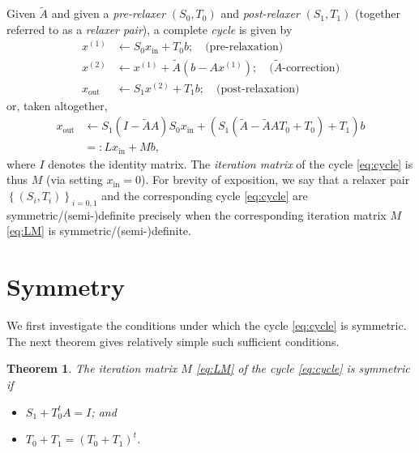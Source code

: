 \documentclass{article}
\newtheorem{theorem}{Theorem}
\begin{document}
Given $\widetilde{A}$ and given a \emph{pre-relaxer} $\left( S_0, T_0 \right)$ and \emph{post-relaxer} $\left( S_1, T_1 \right)$ (together referred to as a \emph{relaxer pair}), a complete \emph{cycle} is given by
\begin{equation} \label{eq:cycle}
\begin{split}
x^{(1)} & \leftarrow S_0 x_{\text{in}} + T_0 b; \quad \text{(pre-relaxation)} \\
x^{(2)} & \leftarrow x^{(1)} + \widetilde{A} \left( b - A x^{(1)} \right); \quad \text{($\widetilde{A}$-correction)} \\
x_{\text{out}} & \leftarrow S_1 x^{(2)} + T_1 b; \quad \text{(post-relaxation)}
\end{split}
\end{equation}
or, taken altogether,
\begin{subequations} \label{eq:LM}
\begin{align}
x_{\text{out}}
  & \leftarrow S_1 \left( I - \widetilde{A} A \right) S_0 x_{\text{in}} + \left( S_1 \left( \widetilde{A} - \widetilde{A} A T_0 + T_0 \right) + T_1 \right) b \\
  & =: L x_{\text{in}} + M b,
\end{align}
\end{subequations}
where $I$ denotes the identity matrix. The \emph{iteration matrix} of the cycle \eqref{eq:cycle} is thus $M$ (via setting $x_{\text{in}} = 0$). For brevity of exposition, we say that a relaxer pair $\left\{ \left( S_i, T_i \right) \right\}_{i = 0,1}$ and the corresponding cycle \eqref{eq:cycle} are symmetric/(semi-)definite precisely when the corresponding iteration matrix $M$ \eqref{eq:LM} is symmetric/(semi-)definite.

\section{Symmetry}

We first investigate the conditions under which the cycle \eqref{eq:cycle} is symmetric. The next theorem gives relatively simple such sufficient conditions.

\begin{theorem} \label{thm:symmetry}
The iteration matrix $M$ \eqref{eq:LM} of the cycle \eqref{eq:cycle} is symmetric if
\begin{itemize}
\item[(S0)] $S_1 + T_0^t A = I$; and
\item[(S1)] $T_0 + T_1 = \left( T_0 + T_1 \right)^t$.
\end{itemize}
\end{theorem}
\end{document}
